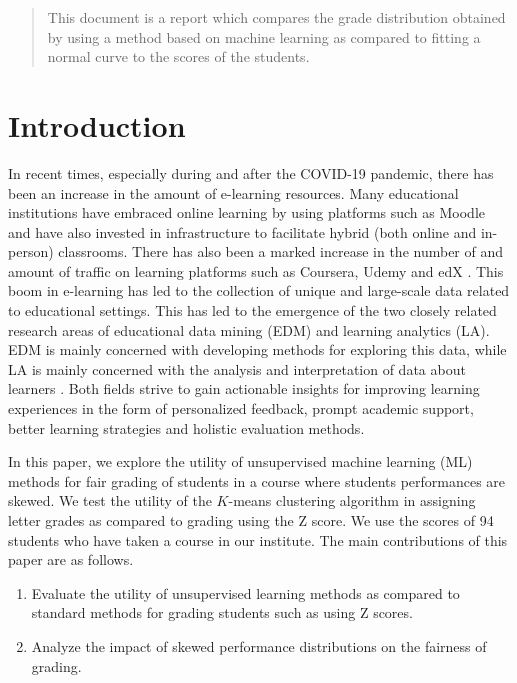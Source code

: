 \documentclass[conference]{IEEEtran}
\begin{document}
\begin{abstract}
    This document is a report which compares the grade distribution obtained by
    using a method based on machine learning as compared to fitting a normal 
    curve to the scores of the students.
\end{abstract}

\section{Introduction}
\label{sec:intro}
In recent times, especially during and after the COVID-19 pandemic, there has
been an increase in the amount of e-learning resources. Many educational
institutions have embraced online learning by using platforms such as Moodle and
have also invested in infrastructure to facilitate hybrid (both online and
in-person) classrooms. There has also been a marked increase in the number of
and amount of traffic on learning platforms such as Coursera, Udemy and edX
\cite{royEmergingTrendsApplications2017}. This boom in e-learning has led to the
collection of unique and large-scale data related to educational settings. This
has led to the emergence of the two closely related research areas of
educational data mining (EDM) and learning analytics (LA). EDM is mainly
concerned with developing methods for exploring this data, while LA is mainly
concerned with the analysis and interpretation of data about learners
\cite{romeroEducationalDataMining2020}. Both fields strive to gain actionable
insights for improving learning experiences in the form of personalized
feedback, prompt academic support, better learning strategies and holistic
evaluation methods.

In this paper, we explore the utility of unsupervised machine learning (ML)
methods for fair grading of students in a course where students performances are
skewed. We test the utility of the $K$-means clustering algorithm in assigning
letter grades as compared to grading using the Z score. We use the scores of 94
students who have taken a course in our institute. The main contributions of
this paper are as follows.

\begin{enumerate}
    \item Evaluate the utility of unsupervised learning methods as compared to
    standard methods for grading students such as using Z scores.
    \item Analyze the impact of skewed performance distributions on the fairness
    of grading.
\end{enumerate}
\end{document}
